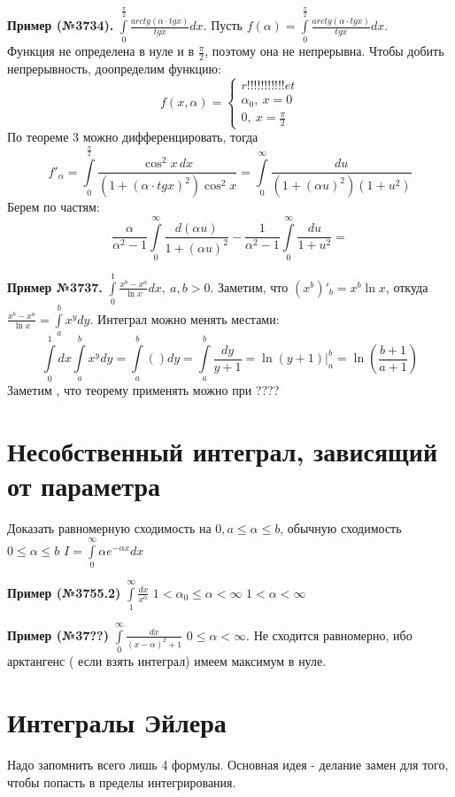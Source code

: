  \textbf{Пример (№3734).}
 $\int\limits_{0}^{\frac{\pi}{2}} \frac{arctg(\alpha\cdot tg x)}{tg x}dx $.
Пусть $f(\alpha)=\int\limits_{0}^{\frac{\pi}{2}}
\frac{arctg(\alpha\cdot tg x)}{tg x}dx$.\\
Функция не определена в нуле и в $\frac{\pi}{2}$, поэтому она не непрерывна. 
Чтобы добить непрерывность, доопределим функцию:
$$f(x,\alpha)=\begin{cases}
    r!!!!!!!!!!!et\\
\alpha_0,~x=0\\
0,~x=\frac{\pi}{2}
\end{cases}$$
По теореме 3 можно дифференцировать, тогда 
$$f'_\alpha=
\int\limits_{0}^{\frac{\pi}{2}} \frac{\cos^2x\,dx}
{(1+(\alpha\cdot tgx)^2)\cos^2x}=
\int\limits_{0}^{\infty}\frac{du}{(1+(\alpha u)^2)(1+u^2)} $$
Берем по частям:
$$\frac{\alpha}{\alpha^2-1}\int\limits_{0}^{\infty} \frac{d(\alpha u)}{
1+(\alpha u)^2}-\frac{1}{\alpha^2-1}\int\limits_{0}^{\infty}\frac{du}{
1+u^2} =$$




\textbf{Пример №3737.} $\int\limits_{0}^{1} \frac{x^b-x^a}{\ln x}dx,~a,b>0$.
Заметим, что $(x^b)'_b=x^b\ln x$, откуда $\frac{x^b-x^a}{\ln x}=
\int\limits_{a}^{b}x^ydy$.
Интеграл можно менять местами: 
$$\int\limits_{0}^{1} dx \int\limits_{a}^{b} x^ydy=\int\limits_{a}^{b} 
\left(  \right) dy=\int\limits_{a}^{b} \frac{dy}{y+1}=\ln(y+1)\Big|^b_a=
\ln\left( \frac{b+1}{a+1} \right) $$ 
Заметим , что теорему применять можно при ????

\section{Несобственный интеграл, зависящий от параметра}



Доказать равномерную сходимость на $0,a\leqslant \alpha\leqslant b$,
обычную сходимость $0\leqslant \alpha\leqslant b$
$I=\int\limits_{0}^{\infty}\alpha e^{-\alpha x}dx$


\textbf{Пример (№3755.2)}  $\int\limits_{1}^{\infty} \frac{dx}{x^\alpha}$ 
$1<\alpha_0\leqslant \alpha<\infty$
$1<\alpha<\infty$

\textbf{Пример (№37??)} $\int\limits_{0}^{\infty}\frac{dx}{(x-\alpha)^2+1}$ 
$0\leqslant \alpha<\infty$. Не сходится равномерно, ибо арктангенс (
если взять интеграл) имеем максимум в нуле. 


\section{Интегралы Эйлера}
Надо запомнить всего лишь 4 формулы. Основная идея - делание замен для того,
чтобы попасть в пределы интегрирования.

